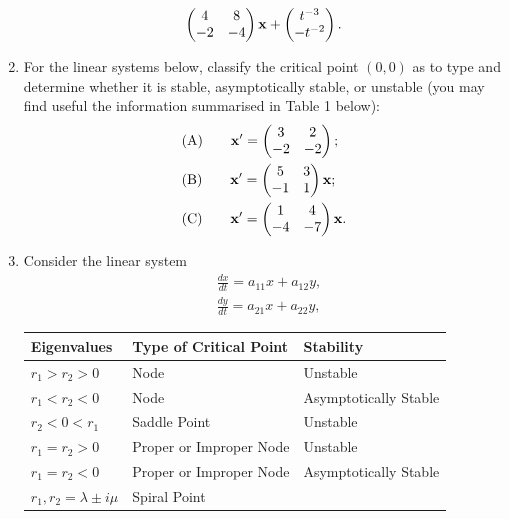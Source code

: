 \documentclass[11pt,a4paper]{article}
\begin{document}
\begin{enumerate}
\begin{align*}
			\begin{pmatrix}
				4 & 8\\
				-2 & -4
			\end{pmatrix}\vb{x} + 
			\begin{pmatrix}
				t^{-3}\\
				-t^{-2}
			\end{pmatrix}.
		\end{align*}
		\item For the linear systems below, classify the critical point $(0, 0)$ as to type and determine whether it is stable, asymptotically stable, or unstable (you may find useful the information summarised in Table 1 below):
		\begin{align*}
			&\text{(A)}\qquad \vb{x}^\prime = 
			\begin{pmatrix}
				3 & 2\\
				-2 & -2
			\end{pmatrix};\\
			&\text{(B)}\qquad \vb{x}^\prime =
			\begin{pmatrix}
				5 & 3\\
				-1 & 1
			\end{pmatrix}\vb{x};\\
			&\text{(C)}\qquad \vb{x}^\prime = 
			\begin{pmatrix}
				1 & 4\\
				-4 & -7
			\end{pmatrix}\vb{x}.
		\end{align*}
		\item Consider the linear system
		\begin{align*}
			& \frac{dx}{dt} = a_{11}x + a_{12}y,\\
			& \frac{dy}{dt} = a_{21}x + a_{22}y,
		\end{align*}
		\begin{table}[H]
			\centering
			\begin{tabular}{ |l|l|l| } 
			 \hline
			 \textbf{Eigenvalues} & \textbf{Type of Critical Point} & \textbf{Stability}\\
			 \hline
			 \hline
			 $r_1>r_2>0$ & Node & Unstable \\
			 \hline
			 $r_1 < r_2 < 0$ & Node & Asymptotically Stable \\
			 \hline
			 $r_2 < 0 < r_1$ & Saddle Point & Unstable \\ 
			 \hline
			 $r_1 = r_2 > 0$ & Proper or Improper Node & Unstable \\
			 \hline
			 $r_1 = r_2 < 0$ & Proper or Improper Node & Asymptotically Stable \\
			 \hline
			 $r_1,r_2 = \lambda \pm i\mu$ & Spiral Point &  \\
			 

\end{tabular}
\end{table}
\end{enumerate}
\end{document}

